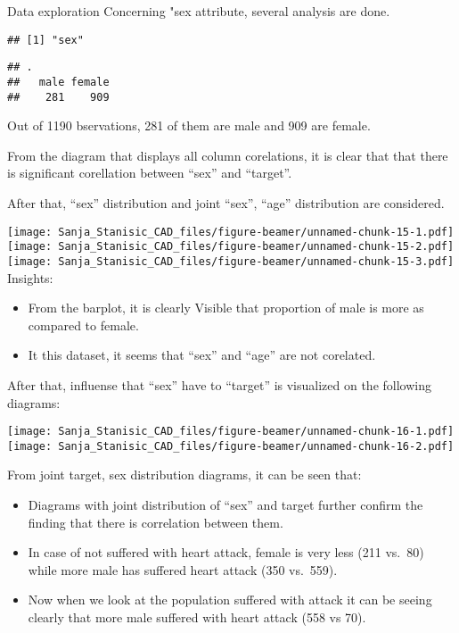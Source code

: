 \documentclass[
  ignorenonframetext,
]{beamer}
\begin{document}
\begin{frame}[fragile]{Data exploration}
Concerning "sex attribute, several analysis are done.

\begin{verbatim}
## [1] "sex"
\end{verbatim}

\begin{verbatim}
## .
##   male female 
##    281    909
\end{verbatim}

Out of 1190 bservations, 281 of them are male and 909 are female.

From the diagram that displays all column corelations, it is clear that
that there is significant corellation between ``sex'' and ``target''.

After that, ``sex'' distribution and joint ``sex'', ``age'' distribution
are considered.

\texttt{[image: Sanja\_Stanisic\_CAD\_files/figure-beamer/unnamed-chunk-15-1.pdf]}
\texttt{[image: Sanja\_Stanisic\_CAD\_files/figure-beamer/unnamed-chunk-15-2.pdf]}
\texttt{[image: Sanja\_Stanisic\_CAD\_files/figure-beamer/unnamed-chunk-15-3.pdf]}
Insights:

\begin{itemize}
\item
  From the barplot, it is clearly Visible that proportion of male is
  more as compared to female.
\item
  It this dataset, it seems that ``sex'' and ``age'' are not corelated.
\end{itemize}

After that, influense that ``sex'' have to ``target'' is visualized on
the following diagrams:

\texttt{[image: Sanja\_Stanisic\_CAD\_files/figure-beamer/unnamed-chunk-16-1.pdf]}
\texttt{[image: Sanja\_Stanisic\_CAD\_files/figure-beamer/unnamed-chunk-16-2.pdf]}

From joint target, sex distribution diagrams, it can be seen that:

\begin{itemize}
\item
  Diagrams with joint distribution of ``sex'' and target further confirm
  the finding that there is correlation between them.
\item
  In case of not suffered with heart attack, female is very less (211
  vs.~80) while more male has suffered heart attack (350 vs.~559).
\item
  Now when we look at the population suffered with attack it can be
  seeing clearly that more male suffered with heart attack (558 vs 70).
\end{itemize}


\end{frame}
\end{document}
